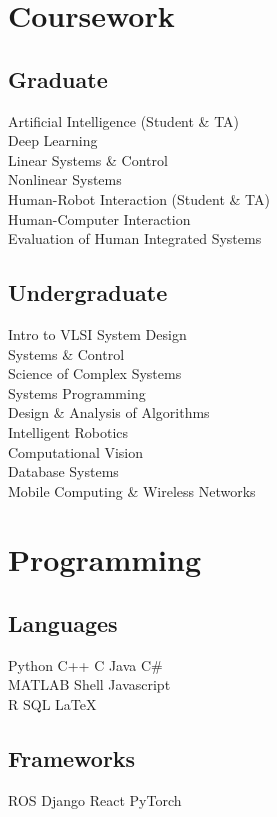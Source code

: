 \documentclass[]{deedy-resume}
\begin{document}
\begin{minipage}[t]{0.33\textwidth}

\section{Coursework}
\subsection{Graduate}
Artificial Intelligence {\scriptsize (Student \& TA)} \\
Deep Learning \\
Linear Systems \& Control \\
Nonlinear Systems \\
Human-Robot Interaction {\scriptsize (Student \& TA)} \\
Human-Computer Interaction \\
Evaluation of Human Integrated Systems \\
\sectionsep

\subsection{Undergraduate}
Intro to VLSI System Design \\
Systems \& Control \\
Science of Complex Systems \\
Systems Programming \\
Design \& Analysis of Algorithms \\
Intelligent Robotics \\
Computational Vision \\
Database Systems \\
Mobile Computing \& Wireless Networks \\


\section{Programming}
\subsection{Languages}
Python \textbullet{} C++ \textbullet{} C \textbullet{} Java \textbullet{} C\# \\
MATLAB \textbullet{} Shell \textbullet{} Javascript \\
R \textbullet{} SQL \textbullet{} \LaTeX \\
\sectionsep

\subsection{Frameworks}
ROS \textbullet{} Django \textbullet{} React \textbullet{} PyTorch

%
%

\end{minipage}
\end{document}
